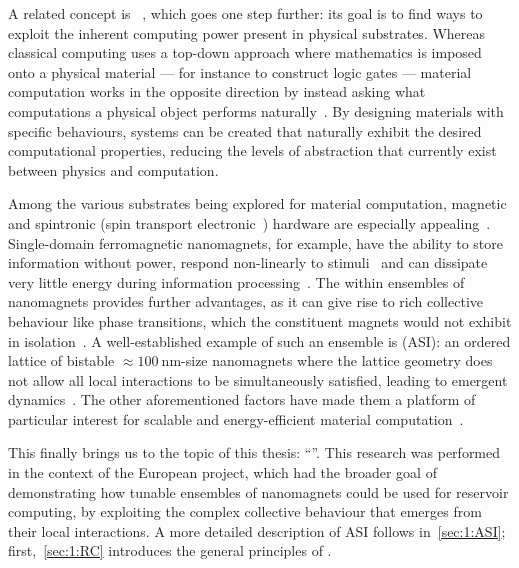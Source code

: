 A related concept is ~\cite{NeglectedPillar}, which goes one step further: its goal is to find ways to exploit the inherent computing power present in physical substrates.
Whereas classical computing uses a top-down approach where mathematics is imposed onto a physical material --- for instance to construct logic gates --- material computation works in the opposite direction by instead asking what computations a physical object performs naturally~\cite{RC_ASI}.
By designing materials with specific behaviours, systems can be created that naturally exhibit the desired computational properties, reducing the levels of abstraction that currently exist between physics and computation. \par
Among the various substrates being explored for material computation, magnetic and spintronic (spin transport electronic~\cite{Spintronics}) hardware are especially appealing~\cite{grollier2020neuromorphic,NeuromorphicSpintronicsProspect,QuantumNeuromorphicOpportunities}.
Single-domain ferromagnetic nanomagnets, for example, have the ability to store information without power, respond non-linearly to stimuli~\cite{NeuromorphicSpintronics} and can dissipate very little energy during information processing~\cite{ThermodynamicLimitsComputation,SpintronicsEnergyEfficientComputing}.
The  within ensembles of nanomagnets provides further advantages, as it can give rise to rich collective behaviour like phase transitions, which the constituent magnets would not exhibit in isolation~\cite{NeuromorphicSpintronicsProspect,RC_ASI}.
A well-established example of such an ensemble is  (ASI): an ordered lattice of bistable $\approx \SI{100}{\nano\metre}$-size nanomagnets where the lattice geometry does not allow all local interactions to be simultaneously satisfied, leading to emergent dynamics~\cite{ASIpyrochlores}.
The other aforementioned factors have made them a platform of particular interest for scalable and energy-efficient material computation~\cite{PhD_Stromberg}. \par
This finally brings us to the topic of this thesis: ``\!\emph{\phdtitle}''.
This research was performed in the context of the European \spinengine project, which had the broader goal of demonstrating how tunable ensembles of nanomagnets could be used for reservoir computing, by exploiting the complex collective behaviour that emerges from their local interactions. %
A more detailed description of ASI follows in~\cref{sec:1:ASI}; first,~\cref{sec:1:RC} introduces the general principles of .

